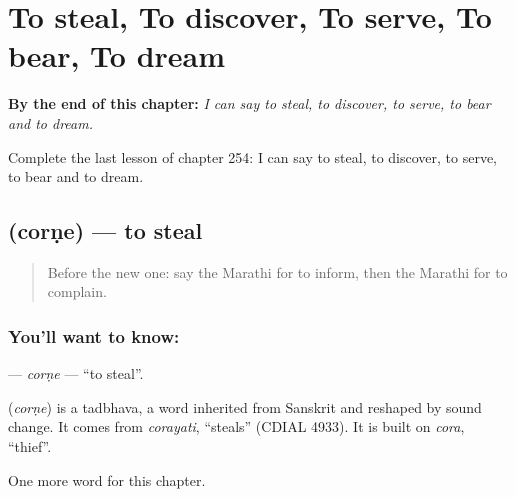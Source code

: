 
\chapter{To steal, To discover, To serve, To bear, To dream}
\label{ch:mr-to-steal-to-discover-to-serve-to-bear-to-dream}

\begin{chapteropening}
\textbf{By the end of this chapter:} \emph{I can say to steal, to discover, to serve, to bear and to dream.}

Complete the last lesson of chapter 254: I can say to steal, to discover, to serve, to bear and to dream.
\end{chapteropening}

\section[\texorpdfstring{\mr{चोरणे} (corṇe)}{चोरणे (corṇe)}]{ (corṇe) — to steal}

\label{lesson:MR-C254-corne}



\begin{quote}
Before the new one: say the Marathi for to inform, then the Marathi for to complain.
\end{quote}

\subsection*{You'll want to know: }
\textbf{} — \emph{corṇe} — \textquotedblleft{}to steal\textquotedblright{}.

\begin{cousinweb}
\textbf{} (\emph{corṇe}) is a tadbhava, a word inherited from Sanskrit and reshaped by sound change. It comes from \emph{corayati}, \textquotedblleft{}steals\textquotedblright{} (CDIAL 4933). It is built on \emph{cora}, \textquotedblleft{}thief\textquotedblright{}.
\end{cousinweb}

\begin{grammarlens}[title={What you've built}]
One more word for this chapter.
\end{grammarlens}

